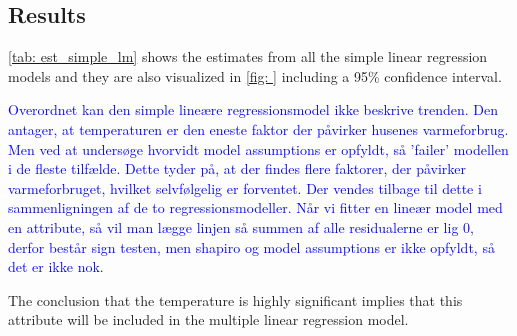 \subsection{Results}
\cref{tab: est_simple_lm} shows the estimates from all the simple linear regression models and they are also visualized in \cref{fig: } including a 95\% confidence interval.

\noindent \textcolor{blue}{Overordnet kan den simple lineære regressionsmodel ikke beskrive trenden. Den antager, at temperaturen er den eneste faktor der påvirker husenes varmeforbrug. Men ved at undersøge hvorvidt model assumptions er opfyldt, så 'failer' modellen i de fleste tilfælde. Dette tyder på, at der findes flere faktorer, der påvirker varmeforbruget, hvilket selvfølgelig er forventet. Der vendes tilbage til dette i sammenligningen af de to regressionsmodeller. Når vi fitter en lineær model med en attribute, så vil man lægge linjen så summen af alle residualerne er lig 0, derfor består sign testen, men shapiro og model assumptions er ikke opfyldt, så det er ikke nok.}

The conclusion that the temperature is highly significant implies that this attribute will be included in the multiple linear regression model.

